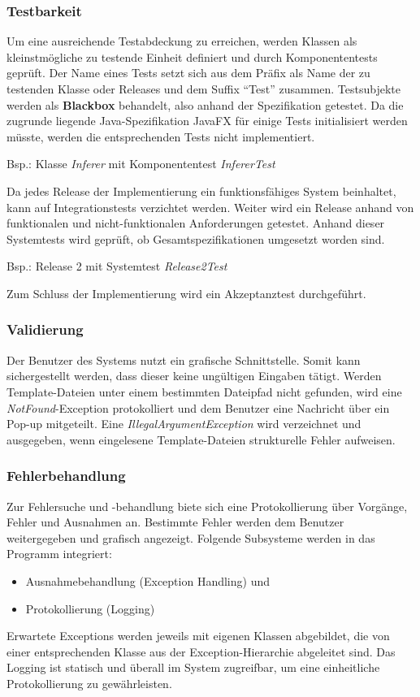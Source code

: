 \documentclass[11pt]{article}
\begin{document}
    \subsubsection{Testbarkeit}
    Um eine ausreichende Testabdeckung zu erreichen, werden Klassen als kleinstmögliche zu testende Einheit definiert
    und durch Komponententests geprüft.
    Der Name eines Tests setzt sich aus dem Präfix als Name der zu testenden Klasse oder Releases und dem Suffix
    "`Test"'
    zusammen.
    Testsubjekte werden als \textbf{Blackbox} behandelt, also anhand der Spezifikation getestet.
    Da die zugrunde liegende Java-Spezifikation JavaFX für einige Tests initialisiert werden müsste,
    werden die entsprechenden Tests nicht implementiert.
    \begin{center}
        Bsp.: Klasse \textit{Inferer} mit Komponententest \textit{InfererTest}
    \end{center}
    Da jedes Release der Implementierung ein funktionsfähiges System beinhaltet, kann auf Integrationstests
    verzichtet werden.
    Weiter wird ein Release anhand von funktionalen und nicht-funktionalen Anforderungen getestet.
    Anhand dieser Systemtests wird geprüft, ob Gesamtspezifikationen umgesetzt worden sind.
    \begin{center}
        Bsp.: Release 2 mit Systemtest \textit{Release2Test}
    \end{center}
    Zum Schluss der Implementierung wird ein Akzeptanztest durchgeführt.

    \subsubsection{Validierung}
    Der Benutzer des Systems nutzt ein grafische Schnittstelle.
    Somit kann sichergestellt werden, dass dieser keine ungültigen Eingaben tätigt.
    Werden Template-Dateien unter einem bestimmten Dateipfad nicht gefunden, wird eine \textit{NotFound}-Exception
    protokolliert und dem Benutzer eine Nachricht über ein Pop-up mitgeteilt.
    Eine \textit{IllegalArgumentException} wird verzeichnet und ausgegeben, wenn eingelesene Template-Dateien
    strukturelle Fehler aufweisen.

    \subsubsection{Fehlerbehandlung}
    Zur Fehlersuche und -behandlung biete sich eine Protokollierung über Vorgänge, Fehler und Ausnahmen an.
    Bestimmte Fehler werden dem Benutzer weitergegeben und grafisch angezeigt.
    Folgende Subsysteme werden in das Programm integriert:
    \begin{itemize}
        \item Ausnahmebehandlung (Exception Handling) und
        \item Protokollierung (Logging)
    \end{itemize}
    Erwartete Exceptions werden jeweils mit eigenen Klassen abgebildet, die von einer entsprechenden Klasse aus der
    Exception-Hierarchie abgeleitet sind.
    Das Logging ist statisch und überall im System zugreifbar, um eine einheitliche Protokollierung zu gewährleisten.
\end{document}

